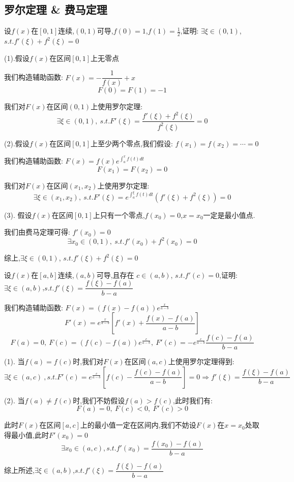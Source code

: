 \subsection{罗尔定理 \& 费马定理}
\begin{proposition}
	设$f(x)$在$[0,1]$连续,$(0,1)$可导,$f(0)=1$,$f(1)=\frac{1}{2}$,证明: $\exists \xi\in(0,1)$, $s.t. f'(\xi)+f^{2}(\xi)=0$
\end{proposition}
\begin{solution}

	(1).假设$f(x)$在区间$[0,1]$上无零点

	我们构造辅助函数: $F(x)=-\dfrac{1}{f(x)}+x$
	$$F(0)=F(1)=-1$$

	我们对$F(x)$在区间$(0,1)$上使用罗尔定理:
	$$\exists \xi\in(0,1),\ s.t. F'(\xi)=\dfrac{f'(\xi)+f^{2}(\xi)}{f^2(\xi)}=0$$

	(2).假设$f(x)$在区间$[0,1]$上至少两个零点,我们假设: $f(x_{1})=f(x_{2})=\cdots=0$

	我们构造辅助函数: $F(x)=f(x)e^{\int_{a}^{x}f(t)dt}$
	$$F(x_{1})=F(x_{2})=0$$

	我们对$F(x)$在区间$(x_{1},x_{2})$上使用罗尔定理:
	$$\exists \xi\in(x_{1},x_{2}),\ s.t. F'(\xi)=e^{\int_{a}^{\xi}f(t)dt}(f'(\xi)+f^2(\xi))=0$$

	(3). 假设$f(x)$在区间$[0,1]$上只有一个零点,$f(x_{0})=0$,$x=x_{0}$一定是最小值点.

	我们由费马定理可得: $f'(x_{0})=0$
	$$\exists x_{0}\in(0,1),\ s.t. f'(x_{0})+f^{2}(x_{0})=0$$

	综上,$\exists \xi\in(0,1)$, $s.t. f'(\xi)+f^{2}(\xi)=0$
\end{solution}


\begin{proposition}
	设$f(x)$在$[a,b]$连续,$(a,b)$可导,且存在 $c\in(a,b)$, $s.t. f'(c)=0$,证明: $\exists \xi\in(a,b)$,$s.t. f'(\xi)=\dfrac{f(\xi)-f(a)}{b-a}$
\end{proposition}
\begin{solution}

	我们构造辅助函数: $F(x)=(f(x)-f(a))e^{\frac{x}{a-b}}$
	$$F'(x)=e^{\frac{x}{a-b}}[f'(x)+\dfrac{f(x)-f(a)}{a-b}]$$
	$$F(a)=0,\ F(c)=(f(c)-f(a))e^{\frac{c}{a-b}},\ F'(c)=-e^{\frac{c}{a-b}}\dfrac{f(c)-f(a)}{b-a}$$

	(1). 当$f(a)=f(c)$时,我们对$F(x)$在区间$(a,c)$上使用罗尔定理得到:
	$$\exists \xi\in(a,c)\ ,s.t. F'(c)=e^{\frac{c}{a-b}}[f(c)-\dfrac{f(c)-f(a)}{a-b}]=0\Rightarrow f'(\xi)=\dfrac{f(\xi)-f(a)}{b-a}$$

	(2). 当$f(a)\neq f(c)$时,我们不妨假设$f(a)>f(c)$,此时我们有:
	$$F(a)=0,\ F(c)<0,\ F'(c)>0$$

	此时$F(x)$在区间$[a,c]$上的最小值一定在区间内,我们不妨设$F(x)$在$x=x_{0}$处取得最小值,此时$F'(x_{0})=0$
	$$\exists x_{0}\in(a,c), s.t. f'(x_{0})=\dfrac{f(x_{0})-f(a)}{b-a}$$

	综上所述,$\exists \xi\in(a,b)$,$s.t. f'(\xi)=\dfrac{f(\xi)-f(a)}{b-a}$
\end{solution}

